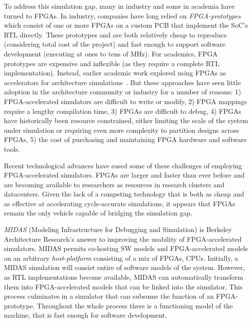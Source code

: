 To address this simulation gap, many in industry and some in academia have
turned to FPGAs. In industry, companies have long relied on
\emph{FPGA-prototypes} which consist of one or more FPGAs on a custom PCB that
implement the SoC's RTL directly. These prototypes and are both relatively
cheap to reproduce (considering total cost of the project) and fast enough to
support software development (executing at ones to tens of MHz). For academics,
FPGA prototypes are expensive and inflexible (as they require a complete RTL
implementation). Instead, earlier academic work explored using FPGAs as
accelerators for architecture simulations~\cite{fast, fame, hasim,
protoflex,ramp}.  But these approaches have seen little adoption in the
architecture community or industry for a number of reasons: 1) FPGA-accelerated
simulators are difficult to write or modify, 2) FPGA mappings require a lengthy
compilation time, 3) FPGAs are difficult to debug, 4) FPGAs have historically
been resource constrained, either limiting the scale of the system under
simulation or requiring even more complexity to partition designs across FPGAs,
5) the cost of purchasing and maintaining FPGA hardware and software tools.

Recent technological advances have eased some of these challenges of employing
FPGA-accelerated simulators. FPGAs are larger and faster than ever before and
are becoming available to researchers as resources in research
clusters\cite{catapultannounce} and datacenters\cite{amazonf1}.  Given the lack
of a competing technology that is both as cheap and as effective at
accelerating cycle-accurate simulations, it appears that FPGAs remain the only
vehicle capable of bridging the simulation gap.

\emph{MIDAS} (Modeling Infrastructure for Debugging and Simulation) is Berkeley
Architecture Research's answer to improving the usability of FPGA-accelerated
simulators. MIDAS permits co-hosting SW models and FPGA-accelerated models on
an arbitrary \emph{host-platform} consisting of a mix of FPGAs, CPUs.
Initially, a MIDAS simulation will consist entire of software models of the
system.  However, as RTL implementations become available, MIDAS can
automatically transform them into FPGA-accelerated models that can be linked
into the simulator. This process culminates in a simulator that can subsume the
function of an FPGA-prototype. Throughout the whole process there is a functioning
model of the machine, that is fast enough for software development.

